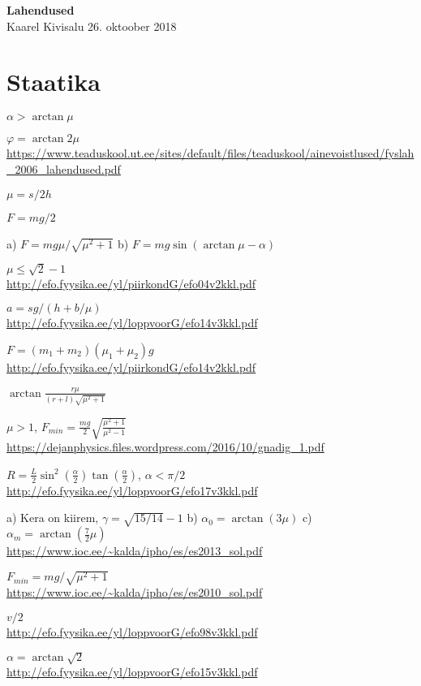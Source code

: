 \documentclass[a4paper,11pt,twocolumn]{article}
\begin{document}
{\huge \textbf{Lahendused}} \\
{Kaarel Kivisalu \hfill 26. oktoober 2018}

\section{Staatika}
\begin{solutions}
	\item \( \alpha>\arctan \mu \)
	\item \( \varphi=\arctan 2\mu \) \\ \url{https://www.teaduskool.ut.ee/sites/default/files/teaduskool/ainevoistlused/fyslah_2006_lahendused.pdf}
	\item \( \mu=s/2h \)
	\item \( F=mg/2 \)
	\item a) \( F=mg\mu/\sqrt{\mu^2+1} \) b) \( F=mg \sin (\arctan \mu -\alpha) \)
	\item \( \mu \le \sqrt{2}-1 \) \\ \url{http://efo.fyysika.ee/yl/piirkondG/efo04v2kkl.pdf}
	\item 
	\item \( a=sg/(h+b/\mu) \) \\ \url{http://efo.fyysika.ee/yl/loppvoorG/efo14v3kkl.pdf}
	\item \( F=(m_1+m_2)(\mu_1+\mu_2)g \) \\ \url{http://efo.fyysika.ee/yl/piirkondG/efo14v2kkl.pdf}
	\item \( \arctan \frac{r\mu}{(r+l)\sqrt{\mu^2+1}} \)
	\item \( \mu > 1 \), \( F_{min}=\frac{mg}{2} \sqrt{\frac{\mu^2+1}{\mu^2-1}} \) \\
	\url{https://dejanphysics.files.wordpress.com/2016/10/gnadig_1.pdf}
	\item \( R=\frac{L}{2}\sin^2(\frac{\alpha}{2})\tan(\frac{\alpha}{2}) \), \( \alpha < \pi/2 \)\\ \url{http://efo.fyysika.ee/yl/loppvoorG/efo17v3kkl.pdf}
	\item a) Kera on kiirem, \( \gamma=\sqrt{15/14}-1 \) b) \( \alpha_0=\arctan(3\mu) \) c) \( \alpha_m=\arctan(\frac{7}{2}\mu) \)  \\ \url{https://www.ioc.ee/~kalda/ipho/es/es2013_sol.pdf}
	\item \( F_{min}={mg}/{\sqrt{\mu^2+1}} \) \\ \url{https://www.ioc.ee/~kalda/ipho/es/es2010_sol.pdf}
	\item \( v/2 \) \\ \url{http://efo.fyysika.ee/yl/loppvoorG/efo98v3kkl.pdf}
	\item \( \alpha=\arctan\sqrt{2} \)\\ \url{http://efo.fyysika.ee/yl/loppvoorG/efo15v3kkl.pdf}
\end{solutions}
\end{document}
